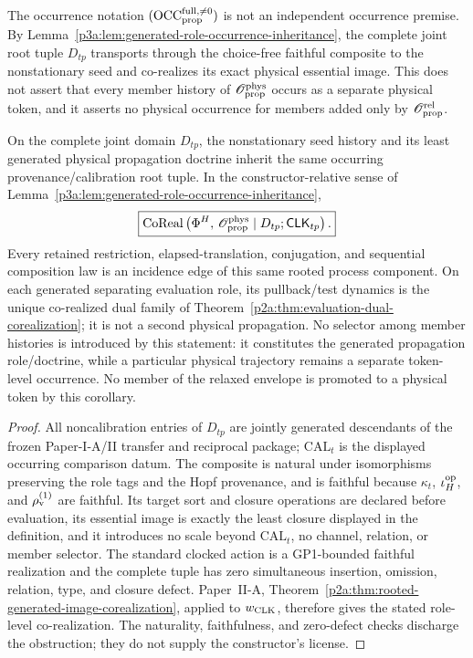 \documentclass[12pt,a4paper]{article}
\begin{document}
\begin{definition}
The occurrence notation
\((\mathrm{OCC}_{\rm prop}^{\rm full,\ne0})\) is not an
independent occurrence premise.  By
Lemma~\ref{p3a:lem:generated-role-occurrence-inheritance}, the complete joint
root tuple \(D_{tp}\) transports through the choice-free faithful composite to
the nonstationary seed and co-realizes its exact physical essential image.
This does not assert that every member history of
\(\mathscr O_{\rm prop}^{\rm phys}\) occurs as a separate physical token, and
it asserts no physical occurrence for members added only by
\(\mathscr O_{\rm prop}^{\rm rel}\).
\end{definition}

\begin{corollary}
\label{p3a:cor:clocked-hopf-corealization}
On the complete joint domain \(D_{tp}\), the nonstationary seed history and
its least generated physical propagation doctrine inherit the same occurring
provenance/calibration root tuple.  In the constructor-relative sense of
Lemma~\ref{p3a:lem:generated-role-occurrence-inheritance},
\[
 \boxed{
\operatorname{CoReal}
 \left(
 \Phi^H,\,\mathscr O_{\rm prop}^{\rm phys}
 \mid D_{tp};\mathsf{CLK}_{tp}
 \right).}
\]
Every retained restriction, elapsed-translation, conjugation, and sequential
composition law is an incidence edge of this same rooted process component.
On each generated separating evaluation role, its pullback/test dynamics is
the unique co-realized dual family of
Theorem~\ref{p2a:thm:evaluation-dual-corealization}; it is not a second
physical propagation.
No selector among member histories is introduced by this statement: it
constitutes the generated propagation role/doctrine, while a particular
physical trajectory remains a separate token-level occurrence.  No member of
the relaxed envelope is promoted to a physical token by this corollary.
\end{corollary}

\begin{proof}
All noncalibration entries of \(D_{tp}\) are jointly generated descendants of
the frozen Paper-I-A/II transfer and reciprocal package; \(\mathrm{CAL}_t\) is
the displayed occurring comparison datum.  The composite is natural under
isomorphisms preserving the role tags and the Hopf provenance, and is faithful
because \(\kappa_t\), \(\iota_H^{\rm op}\), and
\(\rho_{\rm v}^{(1)}\) are faithful.  Its target sort and closure operations
are declared before evaluation, its essential image is exactly the least
closure displayed in the definition, and it introduces no scale beyond
\(\mathrm{CAL}_t\), no channel, relation, or member selector.  The standard
clocked action is a GP1-bounded faithful realization and the complete tuple has
zero simultaneous insertion, omission, relation, type, and closure defect.
Paper~II-A,
Theorem~\ref{p2a:thm:rooted-generated-image-corealization}, applied to
\(w_{\rm CLK}\), therefore gives the stated role-level co-realization.  The
naturality, faithfulness, and zero-defect checks discharge the obstruction;
they do not supply the constructor's license.
\end{proof}
\end{document}
